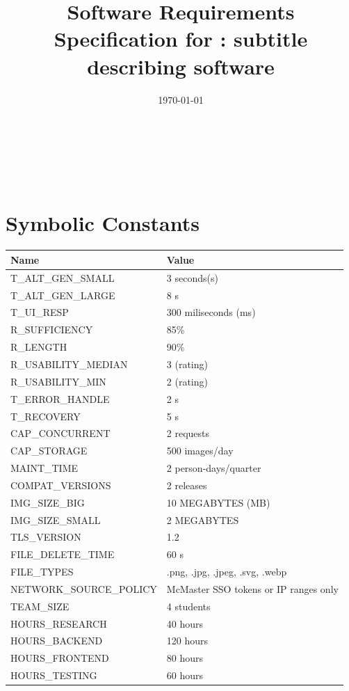 \documentclass[12pt]{article}
\begin{document}
\title{Software Requirements Specification for \progname: subtitle
describing software}
\author{\authname}
\date{\today}

\maketitle

~\newpage


\tableofcontents
~\newpage

\section*{Symbolic Constants}
\begin{tabularx}{\textwidth}{|X|X|}
\toprule {\textbf{Name}} & {\textbf{Value}}\\
\midrule
T\_ALT\_GEN\_SMALL & 3 seconds(s) \\
T\_ALT\_GEN\_LARGE & 8 s \\
T\_UI\_RESP & 300 miliseconds (ms) \\
R\_SUFFICIENCY & 85\% \\
R\_LENGTH & 90\% \\
R\_USABILITY\_MEDIAN & 3 (rating) \\
R\_USABILITY\_MIN & 2 (rating) \\
T\_ERROR\_HANDLE & 2 s \\
T\_RECOVERY & 5 s \\
CAP\_CONCURRENT & 2 requests \\
CAP\_STORAGE & 500 images/day \\
MAINT\_TIME & 2 person-days/quarter \\
COMPAT\_VERSIONS & 2 releases \\
IMG\_SIZE\_BIG & 10 MEGABYTES (MB) \\
IMG\_SIZE\_SMALL & 2 MEGABYTES \\
TLS\_VERSION & 1.2 \\
FILE\_DELETE\_TIME & 60 s \\
FILE\_TYPES & .png, .jpg, .jpeg, .svg, .webp \\
NETWORK\_SOURCE\_POLICY & McMaster SSO tokens or IP ranges only\\
TEAM\_SIZE & 4 students \\
HOURS\_RESEARCH & 40 hours \\
HOURS\_BACKEND & 120 hours \\
HOURS\_FRONTEND & 80 hours \\
HOURS\_TESTING & 60 hours \\

\end{tabularx}
\end{document}
